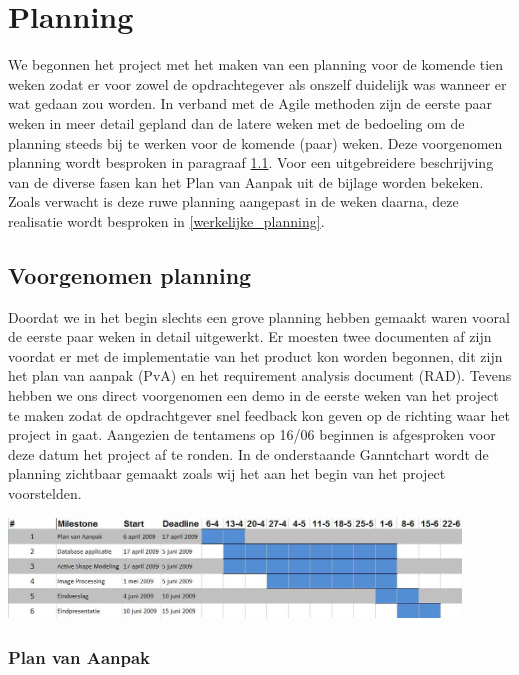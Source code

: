 \section{Planning}
\label{Planning}

We begonnen het project met het maken van een planning voor de komende tien
weken zodat er voor zowel de opdrachtegever als onszelf duidelijk was wanneer
er wat gedaan zou worden. In verband met de Agile methoden zijn de eerste paar
weken in meer detail gepland dan de latere weken met de bedoeling om de
planning steeds bij te werken voor de komende (paar) weken. Deze voorgenomen
planning wordt besproken in paragraaf \ref{voorgenomen_planning}. Voor een
uitgebreidere beschrijving van de diverse fasen kan het Plan van Aanpak uit de
bijlage worden bekeken. Zoals verwacht is deze ruwe planning aangepast in de
weken daarna, deze realisatie wordt besproken in \ref{werkelijke_planning}.

\subsection{Voorgenomen planning}
\label{voorgenomen_planning}

Doordat we in het begin slechts een grove planning hebben gemaakt waren vooral
de eerste paar weken in detail uitgewerkt. Er moesten twee documenten af zijn
voordat er met de implementatie van het product kon worden begonnen, dit zijn
het plan van aanpak (PvA) en het requirement analysis document (RAD). Tevens
hebben we ons direct voorgenomen een demo in de eerste weken van het project te
maken zodat de opdrachtgever snel feedback kon geven op de richting waar het
project in gaat.
Aangezien de tentamens op 16/06 beginnen is afgesproken
voor deze datum het project af te ronden. In de onderstaande Ganntchart wordt
de planning zichtbaar gemaakt zoals wij het aan het begin van het project
voorstelden.

\includegraphics[width=0.9\textwidth]{ganntbefore}

\subsubsection{Plan van Aanpak}

